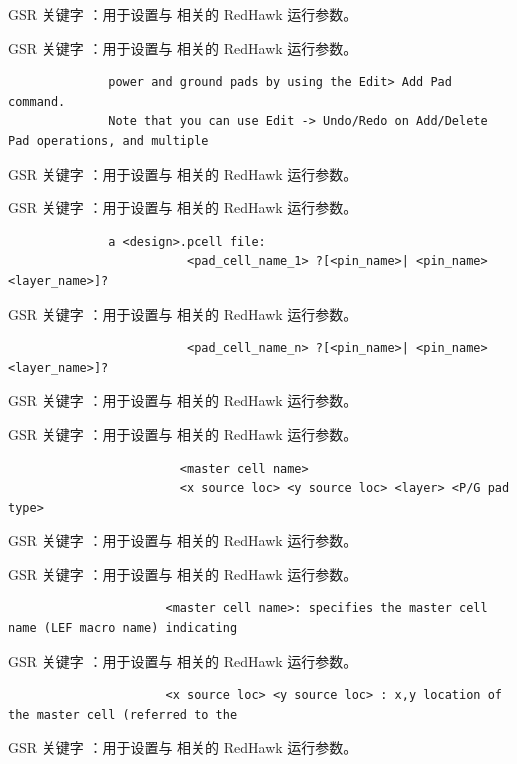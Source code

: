 GSR 关键字 ：用于设置与  相关的 RedHawk 运行参数。

GSR 关键字 ：用于设置与  相关的 RedHawk 运行参数。

\begin{lstlisting}
              power and ground pads by using the Edit> Add Pad command.
              Note that you can use Edit -> Undo/Redo on Add/Delete Pad operations, and multiple
\end{lstlisting}

GSR 关键字 ：用于设置与  相关的 RedHawk 运行参数。

GSR 关键字 ：用于设置与  相关的 RedHawk 运行参数。

\begin{lstlisting}
              a <design>.pcell file:
                         <pad_cell_name_1> ?[<pin_name>| <pin_name> <layer_name>]?
\end{lstlisting}

GSR 关键字 ：用于设置与  相关的 RedHawk 运行参数。

\begin{lstlisting}
                         <pad_cell_name_n> ?[<pin_name>| <pin_name> <layer_name>]?
\end{lstlisting}

GSR 关键字 ：用于设置与  相关的 RedHawk 运行参数。

GSR 关键字 ：用于设置与  相关的 RedHawk 运行参数。

\begin{lstlisting}
                        <master cell name>
                        <x source loc> <y source loc> <layer> <P/G pad type>
\end{lstlisting}

GSR 关键字 ：用于设置与  相关的 RedHawk 运行参数。

GSR 关键字 ：用于设置与  相关的 RedHawk 运行参数。

\begin{lstlisting}
                      <master cell name>: specifies the master cell name (LEF macro name) indicating
\end{lstlisting}

GSR 关键字 ：用于设置与  相关的 RedHawk 运行参数。

\begin{lstlisting}
                      <x source loc> <y source loc> : x,y location of the master cell (referred to the
\end{lstlisting}

GSR 关键字 ：用于设置与  相关的 RedHawk 运行参数。

